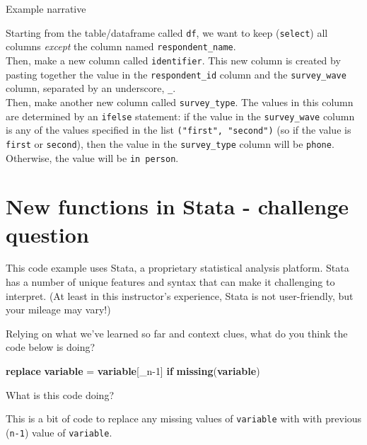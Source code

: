 \documentclass[
]{book}
\newenvironment{Shaded}{\begin{snugshade}}{\end{snugshade}}
\newcommand{\DataTypeTok}[1]{\textcolor[rgb]{0.13,0.29,0.53}{#1}}
\newcommand{\FunctionTok}[1]{\textcolor[rgb]{0.13,0.29,0.53}{\textbf{#1}}}
\newcommand{\KeywordTok}[1]{\textcolor[rgb]{0.13,0.29,0.53}{\textbf{#1}}}
\newcommand{\NormalTok}[1]{#1}
\begin{document}
Example narrative

Starting from the table/dataframe called \texttt{df}, we want to keep (\texttt{select}) all columns \emph{except} the column named \texttt{respondent\_name}.\\

Then, make a new column called \texttt{identifier}. This new column is created by pasting together the value in the \texttt{respondent\_id} column and the \texttt{survey\_wave} column, separated by an underscore, \texttt{\_}.\\

Then, make another new column called \texttt{survey\_type}. The values in this column are determined by an \texttt{ifelse} statement: if the value in the \texttt{survey\_wave} column is any of the values specified in the list \texttt{("first",\ "second")} (so if the value is \texttt{first} or \texttt{second}), then the value in the \texttt{survey\_type} column will be \texttt{phone}. Otherwise, the value will be \texttt{in\ person}.\\

\hfill\break

\section{New functions in Stata - challenge question}\label{new-functions-in-stata---challenge-question}

This code example uses Stata, a proprietary statistical analysis platform. Stata has a number of unique features and syntax that can make it challenging to interpret. (At least in this instructor's experience, Stata is not user-friendly, but your mileage may vary!)

Relying on what we've learned so far and context clues, what do you think the code below is doing?

\begin{Shaded}
\begin{Highlighting}[]
\KeywordTok{replace} \KeywordTok{variable}\NormalTok{ = }\KeywordTok{variable}\NormalTok{[}\DataTypeTok{\_n}\NormalTok{{-}1] }\KeywordTok{if} \FunctionTok{missing}\NormalTok{(}\KeywordTok{variable}\NormalTok{)}
\end{Highlighting}
\end{Shaded}

What is this code doing?

This is a bit of code to replace any missing values of \texttt{variable} with with previous (\texttt{n-1}) value of \texttt{variable}.
\end{document}
